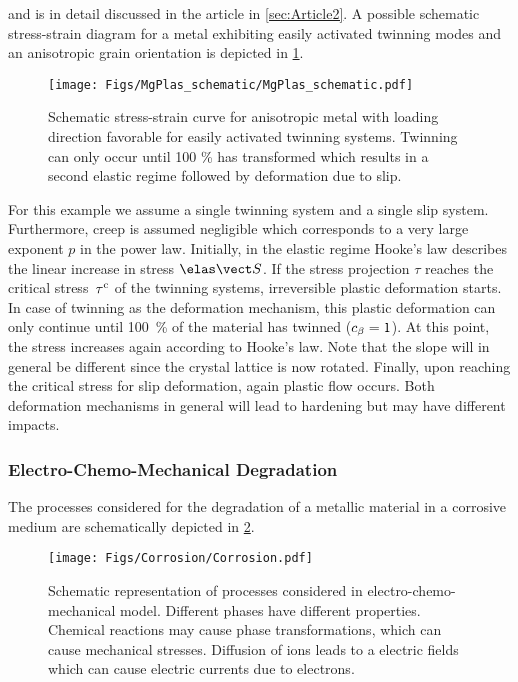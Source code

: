 and is in detail discussed in the article in \cref{sec:Article2}. A possible schematic stress-strain diagram for a metal exhibiting easily activated twinning modes and an anisotropic grain orientation is depicted in \cref{fig:MgPlas}.
\begin{figure}[h!]
  \centering
  \texttt{[image: Figs/MgPlas\_schematic/MgPlas\_schematic.pdf]}
  \caption{Schematic stress-strain curve for anisotropic metal with loading direction favorable for easily activated twinning systems. Twinning can only occur until 100 \% has transformed which results in a second elastic regime followed by deformation due to slip. }
  \label{fig:MgPlas}
\end{figure}

For this example we assume a single twinning system and a single slip system. Furthermore, creep is assumed negligible which corresponds to a very large exponent $p$ in the power law. Initially, in the elastic regime Hooke's law describes the linear increase in stress $\SSe$. If the stress projection $\tau$ reaches the critical stress~$\tau^{\rm c}$ of the twinning systems, irreversible plastic deformation starts. In case of twinning as the deformation mechanism, this plastic deformation can only continue until 100~\% of the material has twinned (\mbox{$c_{\beta}=1$}). At this point, the stress increases again according to Hooke's law. Note that the slope will in general be different since the crystal lattice is now rotated. Finally, upon reaching the critical stress for slip deformation, again plastic flow occurs. Both deformation mechanisms in general will lead to hardening but may have different impacts.

\subsubsection{Electro-Chemo-Mechanical Degradation}
The processes considered for the degradation of a metallic material in a corrosive medium are schematically depicted in \cref{fig:Corrosion}.
\begin{figure}[h!]
  \centering
  \texttt{[image: Figs/Corrosion/Corrosion.pdf]}
  \caption{Schematic representation of processes considered in electro-chemo-mechanical model. Different phases have different properties. Chemical reactions may cause phase transformations, which can cause mechanical stresses. Diffusion of ions leads to a electric fields which can cause electric currents due to electrons.}
  \label{fig:Corrosion}
\end{figure}

